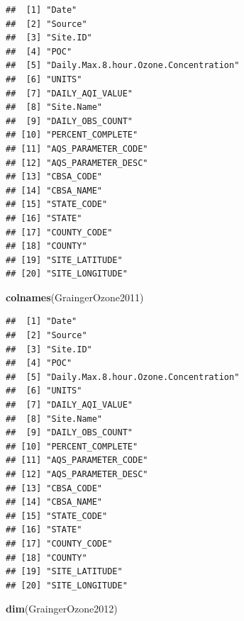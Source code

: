 \documentclass[]{article}
\newenvironment{Shaded}{\begin{snugshade}}{\end{snugshade}}
\newcommand{\KeywordTok}[1]{\textcolor[rgb]{0.13,0.29,0.53}{\textbf{#1}}}
\newcommand{\NormalTok}[1]{#1}
\begin{document}
\begin{verbatim}
##  [1] "Date"                                
##  [2] "Source"                              
##  [3] "Site.ID"                             
##  [4] "POC"                                 
##  [5] "Daily.Max.8.hour.Ozone.Concentration"
##  [6] "UNITS"                               
##  [7] "DAILY_AQI_VALUE"                     
##  [8] "Site.Name"                           
##  [9] "DAILY_OBS_COUNT"                     
## [10] "PERCENT_COMPLETE"                    
## [11] "AQS_PARAMETER_CODE"                  
## [12] "AQS_PARAMETER_DESC"                  
## [13] "CBSA_CODE"                           
## [14] "CBSA_NAME"                           
## [15] "STATE_CODE"                          
## [16] "STATE"                               
## [17] "COUNTY_CODE"                         
## [18] "COUNTY"                              
## [19] "SITE_LATITUDE"                       
## [20] "SITE_LONGITUDE"
\end{verbatim}

\begin{Shaded}
\begin{Highlighting}[]
\KeywordTok{colnames}\NormalTok{(GraingerOzone2011)}
\end{Highlighting}
\end{Shaded}

\begin{verbatim}
##  [1] "Date"                                
##  [2] "Source"                              
##  [3] "Site.ID"                             
##  [4] "POC"                                 
##  [5] "Daily.Max.8.hour.Ozone.Concentration"
##  [6] "UNITS"                               
##  [7] "DAILY_AQI_VALUE"                     
##  [8] "Site.Name"                           
##  [9] "DAILY_OBS_COUNT"                     
## [10] "PERCENT_COMPLETE"                    
## [11] "AQS_PARAMETER_CODE"                  
## [12] "AQS_PARAMETER_DESC"                  
## [13] "CBSA_CODE"                           
## [14] "CBSA_NAME"                           
## [15] "STATE_CODE"                          
## [16] "STATE"                               
## [17] "COUNTY_CODE"                         
## [18] "COUNTY"                              
## [19] "SITE_LATITUDE"                       
## [20] "SITE_LONGITUDE"
\end{verbatim}

\begin{Shaded}
\begin{Highlighting}[]
\KeywordTok{dim}\NormalTok{(GraingerOzone2012)}
\end{Highlighting}
\end{Shaded}
\end{document}
